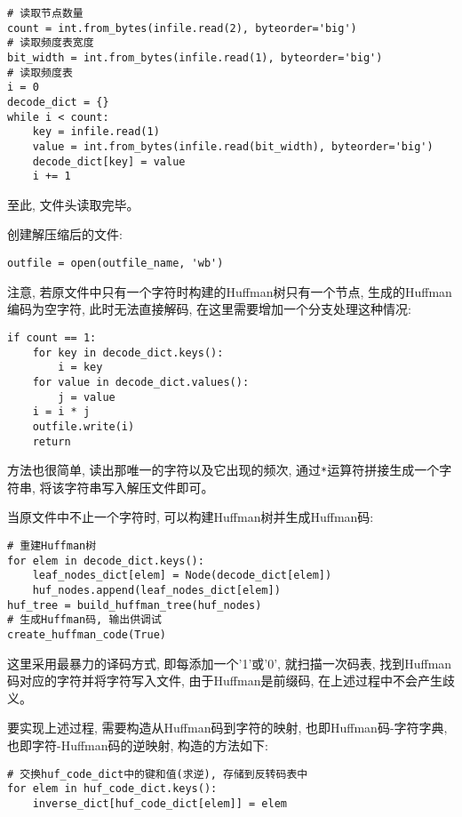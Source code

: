 \documentclass[a4paper]{ctexart}
\begin{document}
{\setmainfont{Courier New Bold}              
\begin{lstlisting}
# 读取节点数量
count = int.from_bytes(infile.read(2), byteorder='big')
# 读取频度表宽度
bit_width = int.from_bytes(infile.read(1), byteorder='big')
# 读取频度表
i = 0
decode_dict = {}
while i < count:
    key = infile.read(1)
    value = int.from_bytes(infile.read(bit_width), byteorder='big')
    decode_dict[key] = value
    i += 1
\end{lstlisting}}

至此, 文件头读取完毕。

创建解压缩后的文件:

{\setmainfont{Courier New Bold}              
\begin{lstlisting}
outfile = open(outfile_name, 'wb')
\end{lstlisting}}

注意, 若原文件中只有一个字符时构建的Huffman树只有一个节点, 生成的Huffman编码为空字符, 此时无法直接解码, 在这里需要增加一个分支处理这种情况:

{\setmainfont{Courier New Bold}              
\begin{lstlisting}
if count == 1:
    for key in decode_dict.keys():
        i = key
    for value in decode_dict.values():
        j = value
    i = i * j
    outfile.write(i)
    return
\end{lstlisting}}

方法也很简单, 读出那唯一的字符以及它出现的频次, 通过\texttt{*}运算符拼接生成一个字符串, 将该字符串写入解压文件即可。

当原文件中不止一个字符时, 可以构建Huffman树并生成Huffman码:

{\setmainfont{Courier New Bold}              
\begin{lstlisting}
# 重建Huffman树
for elem in decode_dict.keys():
    leaf_nodes_dict[elem] = Node(decode_dict[elem])
    huf_nodes.append(leaf_nodes_dict[elem])
huf_tree = build_huffman_tree(huf_nodes)
# 生成Huffman码, 输出供调试
create_huffman_code(True)
\end{lstlisting}}

这里采用最暴力的译码方式, 即每添加一个'1'或'0', 就扫描一次码表, 找到Huffman码对应的字符并将字符写入文件, 由于Huffman是前缀码, 在上述过程中不会产生歧义。

要实现上述过程, 需要构造从Huffman码到字符的映射, 也即Huffman码-字符字典, 也即字符-Huffman码的逆映射, 构造的方法如下:

{\setmainfont{Courier New Bold}              
\begin{lstlisting}
# 交换huf_code_dict中的键和值(求逆), 存储到反转码表中
for elem in huf_code_dict.keys():
    inverse_dict[huf_code_dict[elem]] = elem
\end{lstlisting}}
\end{document}
